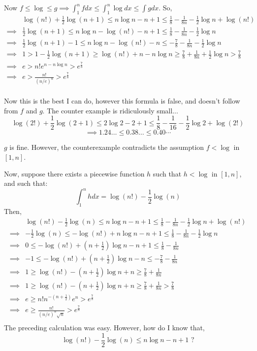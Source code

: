\documentclass{article}
\begin{document}
Now $f\leq\log\leq g \implies\int_{1}^n f dx \leq \int_{1}^n \log
dx\leq  \int g dx $. So,
\begin{align*}
  &\log(n!)  + \frac{1}{2}\log (n+1) \leq n\log n -n +1 \leq
    \frac{1}{8} - \frac{1}{8n} -\frac{1}{2}\log n + \log (n!)\\
  \implies &\frac{1}{2}\log (n+1) \leq n\log n -\log(n!) -n +1 \leq
             \frac{1}{8} - \frac{1}{8n} -\frac{1}{2}\log n\\
  \implies &\frac{1}{2}\log (n+1) -1 \leq n\log n -\log(n!) -n \leq
             -\frac{7}{8} - \frac{1}{8n} -\frac{1}{2}\log n \\
  \implies &1 > 1 -\frac{1}{2}\log (n+1) \geq \log(n!) +n -n\log n  \geq
             \frac{7}{8} + \frac{1}{8n} +\frac{1}{2}\log n > \frac{7}{8} \\
  \implies &e > n!e^{n -n\log n} > e^{\frac{7}{8}} \\
  \implies &e > \frac{n!}{(n/e)^n} > e^{\frac{7}{8}} \\
\end{align*}

Now this is the best I can do, however this formula is false, and
doesn't follow from $f$ and $g$. The counter example is ridiculously small...
\[\log(2!)  + \frac{1}{2}\log (2+1) \leq 2\log 2 -2 +1 \leq
    \frac{1}{8} - \frac{1}{16} -\frac{1}{2}\log 2 + \log (2!)\]
\[\implies 1.24 \dots \leq 0.38 \dots \leq 0.40\cdots\]

$g$ is fine. However, the counterexample contradicts the assumption
$f< \log$ in $[1,n]$.

Now, suppose there exists a piecewise function $h$ such that $h< \log$ in
$[1,n]$, and such that:
\[\int_{1}^n h dx = \log (n!) -\frac{1}{2}\log(n)\]
Then,
\begin{align*}
  &\log(n!) - \frac{1}{2}\log(n) \leq n\log n -n +1 \leq
    \frac{1}{8} - \frac{1}{8n} -\frac{1}{2}\log n + \log (n!)\\
  \implies&- \frac{1}{2}\log(n) \leq -\log (n!) + n\log n -n +1 \leq
            \frac{1}{8} - \frac{1}{8n} -\frac{1}{2}\log n\\
  \implies& 0 \leq -\log (n!) + \left(n+\frac{1}{2}\right)\log n -n +1 \leq
            \frac{1}{8} - \frac{1}{8n}\\
  \implies& -1 \leq -\log (n!) + \left(n+\frac{1}{2}\right)\log n -n \leq
            -\frac{7}{8} - \frac{1}{8n}\\
  \implies& 1 \geq \log (n!) - \left(n+\frac{1}{2}\right)\log n +n \geq
            \frac{7}{8} + \frac{1}{8n}\\
  \implies& 1 \geq \log (n!) - \left(n+\frac{1}{2}\right)\log n +n \geq
            \frac{7}{8} + \frac{1}{8n}>\frac{7}{8}\\
  \implies& e \geq n! n^{-\left(n+\frac{1}{2}\right)}e^n
            >e^{\frac{7}{8}}\\
  \implies& e \geq \frac{n!}{(n/e)^n\sqrt{n}} >e^{\frac{7}{8}}\\
\end{align*}
The preceding calculation was easy. However, how do I know that,
\[\log(n!) - \frac{1}{2}\log(n) \leq n\log n -n +1\text{ ?}\]
\end{document}
